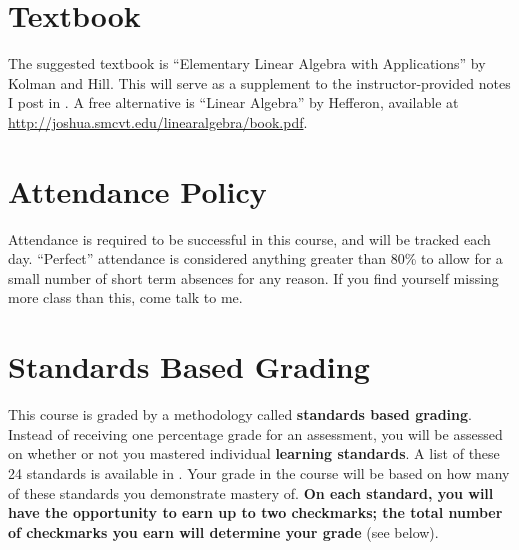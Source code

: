 \documentclass{article}
\begin{document}
\section*{\fontsize{12}{15}\selectfont Textbook}
The suggested textbook is ``Elementary Linear Algebra with Applications'' by Kolman and Hill.  This will serve as a supplement to the instructor-provided notes I post in \LMS.  A free alternative is ``Linear Algebra'' by Hefferon, available at \url{http://joshua.smcvt.edu/linearalgebra/book.pdf}.


\section*{\fontsize{12}{15}\selectfont Attendance Policy}
Attendance is required to be successful in this course, and will be tracked each day.
``Perfect'' attendance is considered anything greater than 80\%
to allow for a small number of short term absences for any reason.
If you find yourself missing more class than this, come talk to me.


\section*{\fontsize{12}{15}\selectfont Standards Based Grading}
This course is graded by a methodology called {\bf standards based grading}.  Instead of receiving one percentage grade for an assessment, you will be assessed on whether or not you mastered individual {\bf learning standards}.  A list of these 24 standards is available in \LMS.  Your grade in the course will be based on how many of these standards you demonstrate mastery of.  {\bf On each standard, you will have the opportunity to earn up to two checkmarks; the total number of checkmarks you earn will determine your grade} (see below).
\end{document}
